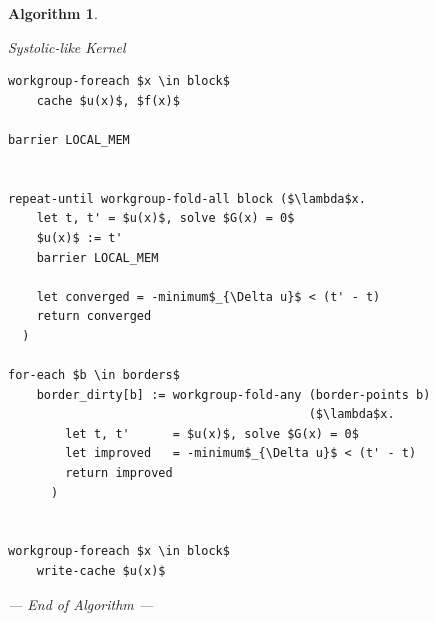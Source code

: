 \documentclass[11pt]{article}       %
\newcommand\clearlines[1]{%
	\if#10\else%
	\leavevmode\\%
	\expandafter\clearlines\expandafter{\the\numexpr#1-1}%
	\fi}
\newtheorem{algX}{Algorithm}
\newenvironment{algorithm}       {\begin{algX}\begin{em}}%
                                 {\par\noindent --- End of Algorithm ---
                                 \end{em}\end{algX}}
\begin{document}

\begin{algorithm}
	\caption{Systolic-like Kernel}
	\label{alg:kernel_systolic}
	\begin{center}
		\footnotesize

		\begin{minipage}{.80\linewidth}

			\begin{lstlisting}[style=code]
workgroup-foreach $x \in block$
    cache $u(x)$, $f(x)$

barrier LOCAL_MEM


repeat-until workgroup-fold-all block ($\lambda$x.
    let t, t' = $u(x)$, solve $G(x) = 0$ 
    $u(x)$ := t'
    barrier LOCAL_MEM
    
    let converged = -minimum$_{\Delta u}$ < (t' - t)
    return converged
  )

for-each $b \in borders$
    border_dirty[b] := workgroup-fold-any (border-points b)
                                          ($\lambda$x.
        let t, t'      = $u(x)$, solve $G(x) = 0$ 
        let improved   = -minimum$_{\Delta u}$ < (t' - t)
        return improved
      )


workgroup-foreach $x \in block$
	write-cache $u(x)$

			\end{lstlisting}
\hfill
		\end{minipage}
	\end{center}
\end{algorithm}
\FloatBarrier
\end{document}
